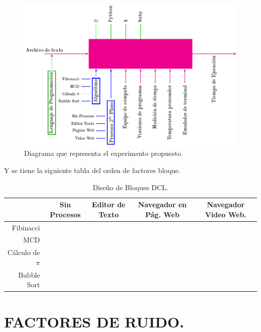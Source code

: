 \documentclass[11pt,a4paper]{article}
\begin{document}
\begin{figure}[hbt!]
	\centering
	\includegraphics[width = 0.8\linewidth]{IMAGENES/2/tikz.pdf}
	\caption{Diagrama que representa el experimento propuesto.}
	\label{fig:diagrama_dcl}
\end{figure}
Y se tiene la siguiente tabla del orden de factores bloque.
\begin{table}[hbt!]
	\centering
	\footnotesize 
	\begin{tabular}{r|*{4}{c}}
		& Sin Procesos &	Editor de Texto &	Navegador en Pág. Web & Navegador Video Web. \\ \hline
		Fibinacci &  &   &   & \\
		MCD &  &   &  &  \\
		Cálculo de \(\pi\) &  &  &   &  \\
		Bubble Sort & &   &   & 
	\end{tabular}
	\caption{Diseño de Bloques DCL.} 
	\label{tab:diseño_dcl_exp}
\end{table}

\section{FACTORES DE RUIDO.} %
\label{sec:factores_ruido}
\end{document}
